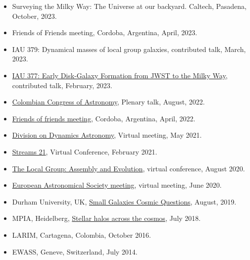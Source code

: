 \documentclass[UTF8]{article}
\begin{document}
\begin{itemize}
  \setlength\itemsep{0.0em}
  \renewcommand\labelitemi{$\cdot$}
\item Surveying the Milky Way: The Universe at our backyard. Caltech,
  Pasadena, October, 2023.
\item Friends of Friends meeting, Cordoba, Argentina, April, 2023. \dag
\item IAU 379: Dynamical masses of local group galaxies, contributed talk, March, 2023.
\item \href{https://www.mso.anu.edu.au/~yting/Malaysia_IAU/}{IAU 377: Early Disk-Galaxy Formation
from JWST to the Milky Way}, contributed talk, February, 2023.
\item \href{https://accefyn.com/microsites/nodos/astroco/congreso-colombiano-de-astronomia-cocoa-2022%E2%80%8B/}{Colombian Congress of Astronomy}, Plenary talk, August, 2022. \dag
\item \href{http://fof.oac.uncor.edu/2022/}{Friends of friends meeting}, Cordoba, Argentina, April, 2022.
\item \href{https://aas.org/meetings/dda52}{Division on Dynamics Astronomy}, Virtual meeting, May 2021.
\item \href{https://stellarstreams.org/streams21/}{Streams 21}, Virtual
  Conference, February 2021. 
\item  \href{https://www.stsci.edu/contents/events/stsci/2020/april/the-local-group-assembly-and-evolution?page=2&filterUUID=6fedb8a7-}{The Local Group: Assembly and Evolution}, virtual conference, August 2020.
\item \href{https://eas.unige.ch/EAS2020/}{European Astronomical Society meeting}, virtual meeting, June 2020.
\item Durham University, UK, \href{http://astro.dur.ac.uk/cosmodwarfs/}{Small Galaxies Cosmic Questions}, August, 2019.
\item MPIA, Heidelberg, \href{http://www.mpia.de/homes/stellarhalos2018-loc/sh2018/index.html}{Stellar halos across the cosmos}, July 2018.
\item LARIM, Cartagena, Colombia, October 2016.
\item EWASS, Geneve, Switzerland, July 2014.
\end{itemize}
  
\end{document}
